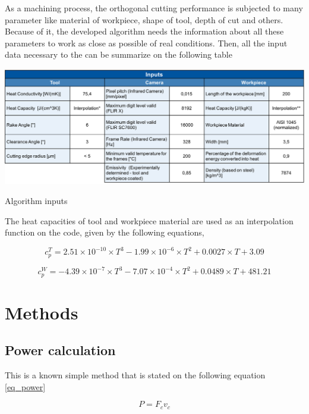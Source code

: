 	As a machining process, the orthogonal cutting performance is subjected to many parameter like material of workpiece, shape of tool, depth of cut and others. Because of it, the developed algorithm needs the information about all these parameters to work as close as possible of real conditions. Then, all the input data necessary to the can be summarize on the following table

	\begin{table}[H]
		\centering
		\captionsetup{justification=centering}
		\includegraphics[scale = 0.6]{Imagens/Inputs.png}
		\caption{Algorithm inputs \cite{augspurger2016experimental}}
		\label{tab:inputs}
	\end{table}

	The heat capacities of tool and workpiece material are used as an interpolation function on the code, given by the following equations,

	\begin{equation} 
	\label{eq_heatCapTool}
		c_{p}^{T} = 2.51\times 10^{- 10}\times T^{3} - 1.99\times 10^{- 6} \times T^{2} + 0.0027 \times T + 3.09
	\end{equation}

	\begin{equation} 
	\label{eq_heatCapWork}
		c_{p}^{W} = -4.39\times 10^{- 7}\times T^{3} - 7.07\times 10^{- 4} \times T^{2} + 0.0489 \times T + 481.21
	\end{equation}

	\section{Methods}
	\label{methods}
	
	\subsection{Power calculation}
	This is a known simple method that is stated on the following equation \ref{eq_power}

	\begin{equation} 
	\label{eq_power}
		P = F_{c}v_{c}
	\end{equation}
	
